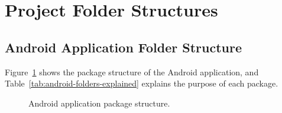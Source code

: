 \documentclass[11pt,a4paper]{article}
\begin{document}
\section{Project Folder Structures}
\label{sec:folderstructure}

\subsection{Android Application Folder Structure}
Figure~\ref{fig:android-folders} shows the package structure of the Android application, and Table~\ref{tab:android-folders-explained} explains the purpose of each package.

\begin{figure}[H]
\centering
{}
\caption{Android application package structure.}
\label{fig:android-folders}
\end{figure}
\end{document}
